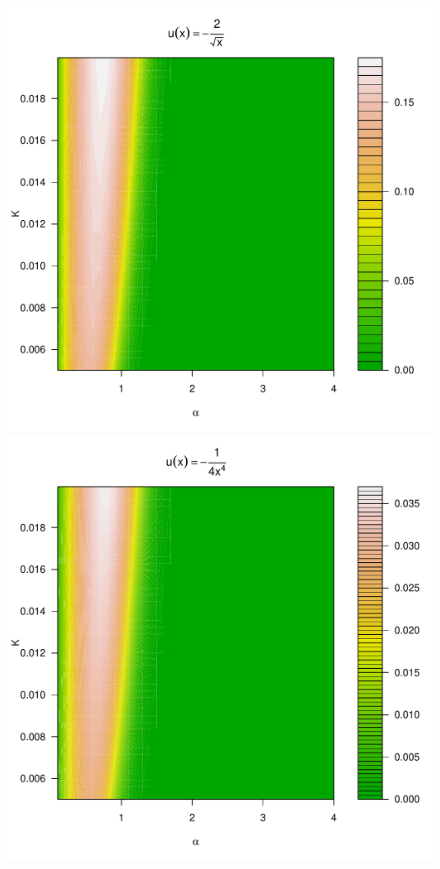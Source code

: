 \documentclass[11pt,a4]{amsart}
\newcommand{\1}{{\mathbf 1}}
\begin{document}
\begin{figure}[htb!]
\begin{minipage}{0.25\linewidth}
  \end{minipage}\hfill
  \begin{minipage}{0.25\linewidth}
    \includegraphics[width=\textwidth]{phi_hat_pareto5e-1.pdf}    
  \end{minipage}\hfill
  \begin{minipage}{0.25\linewidth}
    \includegraphics[width=\textwidth]{phi_hat_pareto4.pdf}

\end{minipage}
\end{figure}
\end{document}
